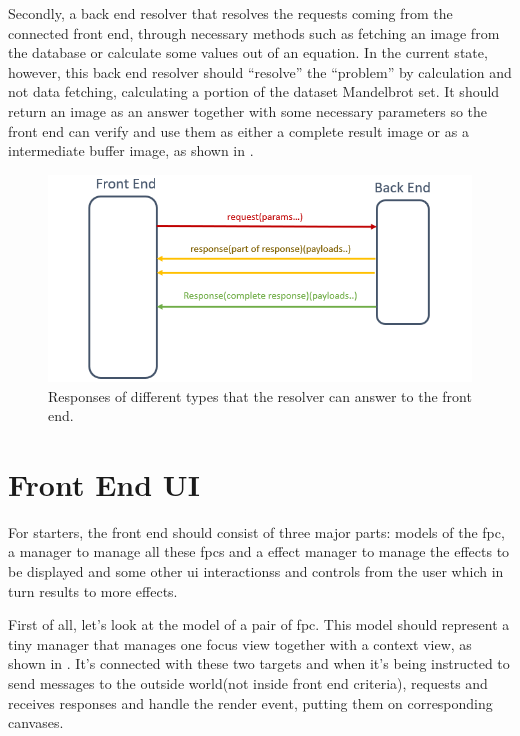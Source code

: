 Secondly, a back end resolver that resolves the requests coming from the connected front end, through necessary methods such as fetching an image from the database or calculate some values out of an equation. In the current state, however, this back end resolver should ``resolve'' the ``problem'' by calculation and not data fetching, calculating a portion of the dataset Mandelbrot set. It should return an image as an answer together with some necessary parameters so the front end can verify and use them as either a complete result image or as a intermediate buffer image, as shown in .

\begin{figure}[th]
\centering
\includegraphics[width=.9\textwidth,keepaspectratio]{Figures/Chapter3/responsetypes.png}
\decoRule
\caption[Different Reponse Types]{Responses of different types that the resolver can answer to the front end.}
\label{fig:responsetypes}
\end{figure}


\section{Front End UI}

For starters, the front end should consist of three major parts: models of the \gls{fpc}, a manager to manage all these \glspl{fpc} and a effect manager to manage the effects to be displayed and some other \gls{ui} interactionss and controls from the user which in turn results to more effects.

First of all, let's look at the model of a pair of \gls{fpc}. This model should represent a tiny manager that manages one focus view together with a context view, as shown in . It's connected with these two targets and when it's being instructed to send messages to the outside world(not inside front end criteria), requests and receives responses and handle the render event, putting them on corresponding canvases.


